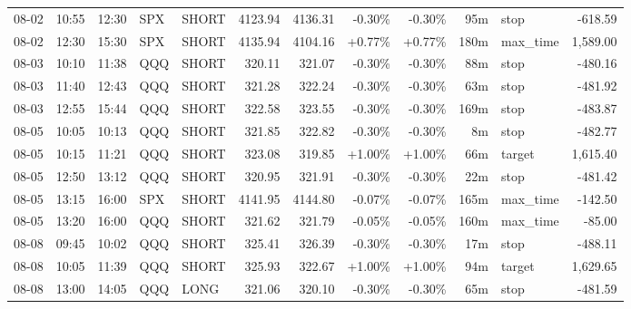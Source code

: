 \documentclass[11pt,a4paper,twoside]{article}
\begin{document}
\begin{center}
\begin{longtable}{>{\color{txtmain}}l l l l l r r r r r >{\color{txtmain}}l r}
08-02 & 10:55 & 12:30 & SPX & SHORT & 4123.94 & 4136.31 & \textcolor{lossred}{-0.30\%} & \textcolor{lossred}{-0.30\%} & 95m & stop & \textcolor{lossred}{-618.59} \\
08-02 & 12:30 & 15:30 & SPX & SHORT & 4135.94 & 4104.16 & \textcolor{wingreen}{+0.77\%} & \textcolor{wingreen}{+0.77\%} & 180m & max\_time & \textcolor{wingreen}{1,589.00} \\
08-03 & 10:10 & 11:38 & QQQ & SHORT & 320.11 & 321.07 & \textcolor{lossred}{-0.30\%} & \textcolor{lossred}{-0.30\%} & 88m & stop & \textcolor{lossred}{-480.16} \\
08-03 & 11:40 & 12:43 & QQQ & SHORT & 321.28 & 322.24 & \textcolor{lossred}{-0.30\%} & \textcolor{lossred}{-0.30\%} & 63m & stop & \textcolor{lossred}{-481.92} \\
08-03 & 12:55 & 15:44 & QQQ & SHORT & 322.58 & 323.55 & \textcolor{lossred}{-0.30\%} & \textcolor{lossred}{-0.30\%} & 169m & stop & \textcolor{lossred}{-483.87} \\
08-05 & 10:05 & 10:13 & QQQ & SHORT & 321.85 & 322.82 & \textcolor{lossred}{-0.30\%} & \textcolor{lossred}{-0.30\%} & 8m & stop & \textcolor{lossred}{-482.77} \\
08-05 & 10:15 & 11:21 & QQQ & SHORT & 323.08 & 319.85 & \textcolor{wingreen}{+1.00\%} & \textcolor{wingreen}{+1.00\%} & 66m & target & \textcolor{wingreen}{1,615.40} \\
08-05 & 12:50 & 13:12 & QQQ & SHORT & 320.95 & 321.91 & \textcolor{lossred}{-0.30\%} & \textcolor{lossred}{-0.30\%} & 22m & stop & \textcolor{lossred}{-481.42} \\
08-05 & 13:15 & 16:00 & SPX & SHORT & 4141.95 & 4144.80 & \textcolor{lossred}{-0.07\%} & \textcolor{lossred}{-0.07\%} & 165m & max\_time & \textcolor{lossred}{-142.50} \\
08-05 & 13:20 & 16:00 & QQQ & SHORT & 321.62 & 321.79 & \textcolor{lossred}{-0.05\%} & \textcolor{lossred}{-0.05\%} & 160m & max\_time & \textcolor{lossred}{-85.00} \\
08-08 & 09:45 & 10:02 & QQQ & SHORT & 325.41 & 326.39 & \textcolor{lossred}{-0.30\%} & \textcolor{lossred}{-0.30\%} & 17m & stop & \textcolor{lossred}{-488.11} \\
08-08 & 10:05 & 11:39 & QQQ & SHORT & 325.93 & 322.67 & \textcolor{wingreen}{+1.00\%} & \textcolor{wingreen}{+1.00\%} & 94m & target & \textcolor{wingreen}{1,629.65} \\
08-08 & 13:00 & 14:05 & QQQ & LONG & 321.06 & 320.10 & \textcolor{lossred}{-0.30\%} & \textcolor{lossred}{-0.30\%} & 65m & stop & \textcolor{lossred}{-481.59} \\

\end{longtable}
\end{center}
\end{document}
